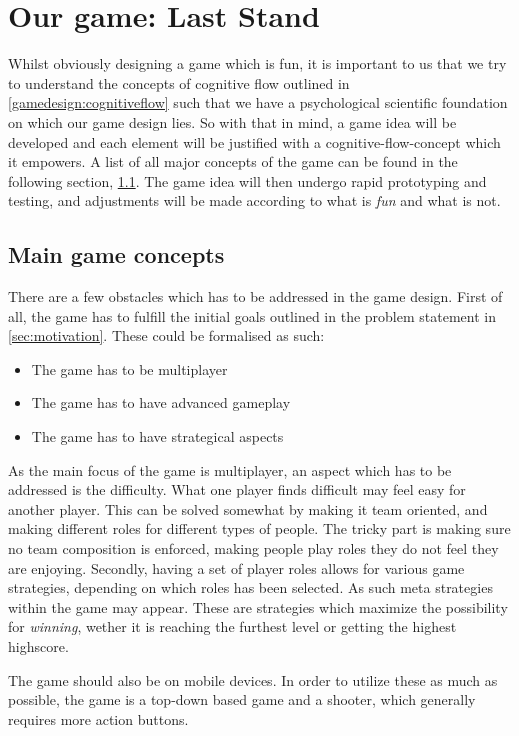 \section{Our game: Last Stand}
Whilst obviously designing a game which is fun, it is important to us that we try to understand the concepts of cognitive flow outlined in \ref{gamedesign:cognitiveflow} such that we have a psychological scientific foundation on which our game design lies. 
So with that in mind, a game idea will be developed and each element will be justified with a cognitive-flow-concept which it empowers. A list of all major concepts of the game can be found in the following section, \ref{gamedesign:maingameconcepts}. 
The game idea will then undergo rapid prototyping and testing, and adjustments will be made according to what is \emph{fun} and what is not.  

\subsection{Main game concepts}\label{gamedesign:maingameconcepts}
There are a few obstacles which has to be addressed in the game design. First of all, the game has to fulfill the initial goals outlined in the problem statement in \ref{sec:motivation}. These could be formalised as such:
\begin{itemize}
\item The game has to be multiplayer
\item The game has to have advanced gameplay
\item The game has to have strategical aspects
\end{itemize}

As the main focus of the game is multiplayer, an aspect which has to be addressed is the difficulty. What one player finds difficult may feel easy for another player. This can be solved somewhat by making it team oriented, and making different roles for different types of people. The tricky part is making sure no team composition is enforced, making people play roles they do not feel they are enjoying. 
Secondly, having a set of player roles allows for various game strategies, depending on which roles has been selected. As such meta strategies within the game may appear. These are strategies which maximize the possibility for \emph{winning}, wether it is reaching the furthest level or getting the highest highscore. 

The game should also be on mobile devices. In order to utilize these as much as possible, the game is a top-down based game and a shooter, which generally requires more action buttons.


